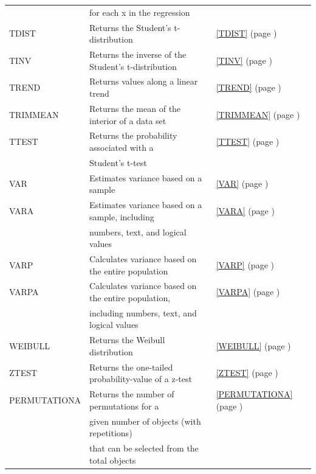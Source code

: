 \begin{center}
\begin{longtable}{l l l }
		& for each x in the regression &   \\
		TDIST & Returns the Student's t-distribution &  \ref{TDIST} (page \pageref{TDIST}) \index{Spreadsheet Functions!TDIST} \\
		TINV  & Returns the inverse of the Student's t-distribution &  \ref{TINV} (page \pageref{TINV}) \index{Spreadsheet Functions!TINV} \\
		TREND & Returns values along a linear trend &  \ref{TREND} (page \pageref{TREND}) \index{Spreadsheet Functions!TREND} \\
		TRIMMEAN & Returns the mean of the interior of a data set &  \ref{TRIMMEAN} (page \pageref{TRIMMEAN}) \index{Spreadsheet Functions!TRIMMEAN} \\
		TTEST & Returns the probability associated with a &  \ref{TTEST} (page \pageref{TTEST}) \index{Spreadsheet Functions!TTEST} \\
		& Student's t-test &   \\
		VAR   & Estimates variance based on a sample &  \ref{VAR} (page \pageref{VAR}) \index{Spreadsheet Functions!VAR} \\
		VARA  & Estimates variance based on a sample, including &  \ref{VARA} (page \pageref{VARA}) \index{Spreadsheet Functions!VARA} \\
		& numbers, text, and logical values &   \\
		VARP  & Calculates variance based on the entire population &  \ref{VARP} (page \pageref{VARP}) \index{Spreadsheet Functions!VARP} \\
		VARPA & Calculates variance based on the entire population, &  \ref{VARPA} (page \pageref{VARPA}) \index{Spreadsheet Functions!VARPA} \\
		& including numbers, text, and logical values &   \\
		WEIBULL & Returns the Weibull distribution &  \ref{WEIBULL} (page \pageref{WEIBULL}) \index{Spreadsheet Functions!WEIBULL} \\
		ZTEST & Returns the one-tailed probability-value of a z-test &  \ref{ZTEST} (page \pageref{ZTEST}) \index{Spreadsheet Functions!ZTEST} \\
		PERMUTATIONA & Returns the number of permutations for a   &  \ref{PERMUTATIONA} (page \pageref{PERMUTATIONA}) \index{Spreadsheet Functions!PERMUTATIONA} \\
		& given number of objects (with repetitions) &   \\		
		& that can be selected from the total objects &   \\							

\end{longtable}
\end{center}
